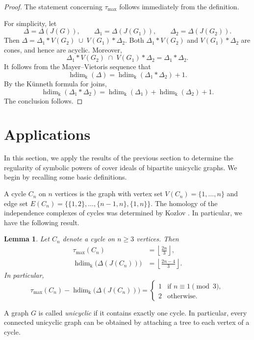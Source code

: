 \documentclass[12pt,amscd]{amsart}
\newtheorem{lem}[thm]{Lemma}
\theoremstyle{definition}
\DeclareMathOperator{\hdim}{hdim}
\def\k {\mathrm k}
\begin{document}
\begin{proof}
The statement concerning $\tau_{\max}$ follows immediately from the definition.

For simplicity, let
\[
\Delta = \Delta(J(G)), \qquad
\Delta_1 = \Delta(J(G_1)), \qquad
\Delta_2 = \Delta(J(G_2)).
\]
Then
\(
\Delta
=
\Delta_1 * V(G_2)
\;\cup\;
V(G_1) * \Delta_2.
\) Both $\Delta_1 * V(G_2)$ and $V(G_1) * \Delta_2$ are cones, and hence are acyclic. Moreover,
\[
\Delta_1 * V(G_2)
\;\cap\;
V(G_1) * \Delta_2
=
\Delta_1 * \Delta_2.
\]
It follows from the Mayer--Vietoris sequence that
\[
\hdim_{\k}(\Delta)
=
\hdim_{\k}(\Delta_1 * \Delta_2) + 1.
\]
By the K\"unneth formula for joins,
\[
\hdim_{\k}(\Delta_1 * \Delta_2)
=
\hdim_{\k}(\Delta_1)
+
\hdim_{\k}(\Delta_2)
+
1.
\]
The conclusion follows.
\end{proof}

\section{Applications}\label{sec_3}
In this section, we apply the results of the previous section to determine the regularity of symbolic powers of cover ideals of bipartite unicyclic graphs. We begin by recalling some basic definitions.

A cycle $C_n$ on $n$ vertices is the graph with vertex set
\(V(C_n) = \{1, \ldots, n\}
\) and edge set
\(E(C_n)
=
\{\{1,2\}, \ldots, \{n-1,n\}, \{1,n\}\}.
\)
The homology of the independence complexes of cycles was determined by Kozlov \cite{Ko}. In particular, we have the following result.

\begin{lem}\label{lem_hdim_cycle}
Let $C_n$ denote a cycle on $n \ge 3$ vertices. Then
\begin{align*}
    \tau_{\max}(C_n) &= \left\lfloor \frac{2n}{3} \right\rfloor,\\
    \hdim_{\k}\bigl(\Delta(J(C_n))\bigr)
    &= \left\lfloor \frac{2n-4}{3} \right\rfloor.
\end{align*}
In particular,
\[
\tau_{\max}(C_n) - \hdim_{\k}\bigl(\Delta(J(C_n))\bigr)
=
\begin{cases}
1 & \text{if } n \equiv 1 \pmod{3},\\
2 & \text{otherwise}.
\end{cases}
\]
\end{lem}

A graph $G$ is called \emph{unicyclic} if it contains exactly one cycle. In particular, every connected unicyclic graph can be obtained by attaching a tree to each vertex of a cycle.
\end{document}
